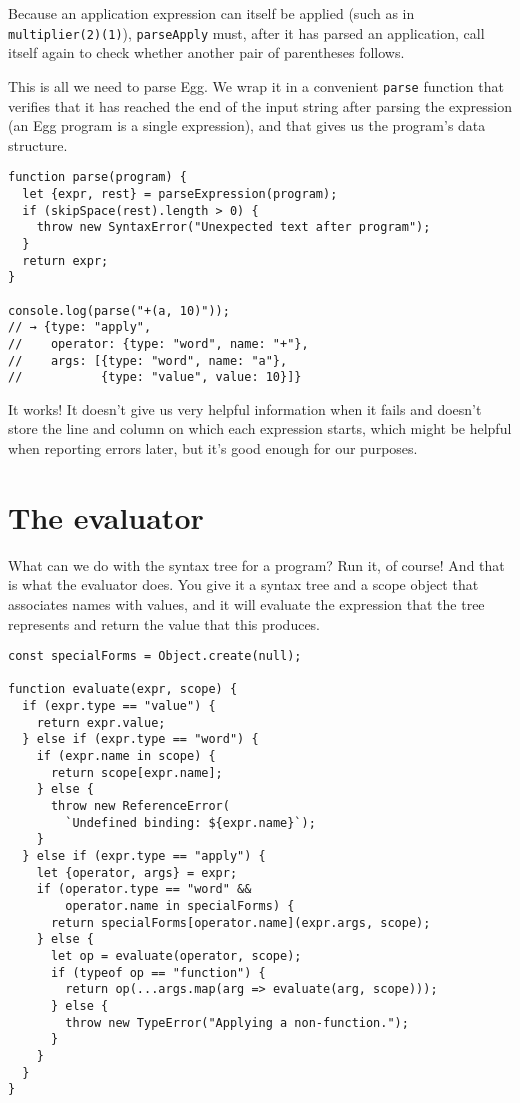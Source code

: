 Because an application expression can itself be applied (such as in \lstinline`multiplier(2)(1)`), \lstinline`parseApply` must, after it has parsed an application, call itself again to check whether another pair of parentheses follows.

This is all we need to parse Egg. We wrap it in a convenient \lstinline`parse` function that verifies that it has reached the end of the input string after parsing the expression (an Egg program is a single expression), and that gives us the program's data structure.

\begin{lstlisting}
function parse(program) {
  let {expr, rest} = parseExpression(program);
  if (skipSpace(rest).length > 0) {
    throw new SyntaxError("Unexpected text after program");
  }
  return expr;
}

console.log(parse("+(a, 10)"));
// → {type: "apply",
//    operator: {type: "word", name: "+"},
//    args: [{type: "word", name: "a"},
//           {type: "value", value: 10}]}
\end{lstlisting}
\noindent{}

It works! It doesn't give us very helpful information when it fails and doesn't store the line and column on which each expression starts, which might be helpful when reporting errors later, but it's good enough for our purposes.

\section{The evaluator}

What can we do with the syntax tree for a program? Run it, of course! And that is what the evaluator does. You give it a syntax tree and a scope object that associates names with values, and it will evaluate the expression that the tree represents and return the value that this produces.

\begin{lstlisting}
const specialForms = Object.create(null);

function evaluate(expr, scope) {
  if (expr.type == "value") {
    return expr.value;
  } else if (expr.type == "word") {
    if (expr.name in scope) {
      return scope[expr.name];
    } else {
      throw new ReferenceError(
        `Undefined binding: ${expr.name}`);
    }
  } else if (expr.type == "apply") {
    let {operator, args} = expr;
    if (operator.type == "word" &&
        operator.name in specialForms) {
      return specialForms[operator.name](expr.args, scope);
    } else {
      let op = evaluate(operator, scope);
      if (typeof op == "function") {
        return op(...args.map(arg => evaluate(arg, scope)));
      } else {
        throw new TypeError("Applying a non-function.");
      }
    }
  }
}
\end{lstlisting}
\noindent{}

